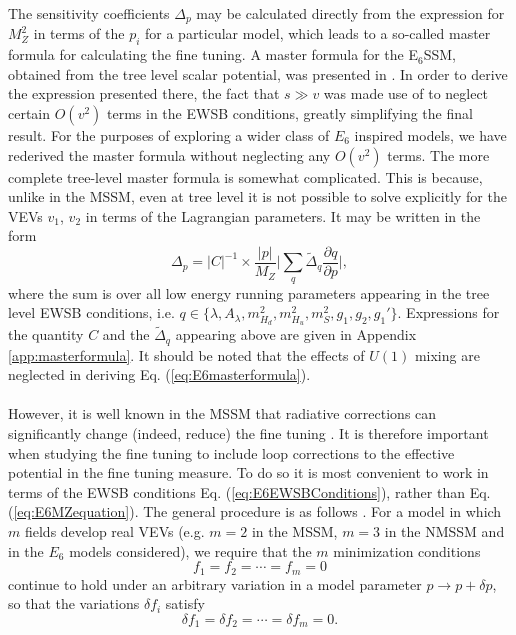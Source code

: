 \documentclass[preprint,amsmath,amssymb,aps,superscriptaddress,prd,showpacs,floatfix,nofootinbib]{revtex4-1}
\newcommand{\be}{\begin{equation}}
\newcommand{\ee}{\end{equation}}
\begin{document}
The sensitivity coefficients $\Delta_p$ may be calculated directly
from the expression for $M_Z^2$ in terms of the $p_i$ for a particular
model, which leads to a so-called master formula for calculating the
fine tuning. A master formula for the E$_6$SSM, obtained from the tree
level scalar potential, was presented in \cite{Athron:2013ipa}. In
order to derive the expression presented there, the fact that $s \gg
v$ was made use of to neglect certain $O(v^2)$ terms in the EWSB
conditions, greatly simplifying the final result. For the purposes of
exploring a wider class of $E_6$ inspired models, we have rederived
the master formula without neglecting any $O(v^2)$ terms. The more
complete tree-level master formula is somewhat complicated. This is
because, unlike in the MSSM, even at tree level it is not possible to
solve explicitly for the VEVs $v_1$, $v_2$ in terms of the Lagrangian
parameters. It may be written in the form \be \Delta_p=|C|^{-1}\times
\frac{|p|}{M_Z}\bigg|\sum_{q}\tilde{\Delta}_q\frac{\partial
  q}{\partial p}\bigg|,
\label{eq:E6masterformula}
\ee where the sum is over all low energy running parameters appearing
in the tree level EWSB conditions, i.e. $q\in\{\lambda, A_\lambda,
m_{H_d}^2,m_{H_u}^2,m_S^2,g_1,g_2,g_1'\}$. Expressions for the
quantity $C$ and the $\tilde{\Delta}_q$ appearing above are given in
Appendix \ref{app:masterformula}. It should be noted that the effects
of $U(1)$ mixing are neglected in deriving
Eq. (\ref{eq:E6masterformula}).\\ \\ However, it is well known in the
MSSM that radiative corrections can significantly change (indeed,
reduce) the fine tuning \cite{Cassel:2010px}. It is therefore
important when studying the fine tuning to include loop corrections to
the effective potential in the fine tuning measure. To do so it is
most convenient to work in terms of the EWSB conditions
Eq. (\ref{eq:E6EWSBConditions}), rather than
Eq. (\ref{eq:E6MZequation}). The general procedure is as follows
\cite{Ellwanger:2011mu}. For a model in which $m$ fields develop real
VEVs (e.g. $m=2$ in the MSSM, $m=3$ in the NMSSM and in the $E_6$
models considered), we require that the $m$ minimization conditions
\begin{equation}\label{eq:EWSBconditions}
f_1=f_2=\dotsb=f_m=0
\end{equation}
continue to hold under an arbitrary variation in a model parameter
$p\rightarrow p+\delta p$, so that the variations $\delta f_i$ satisfy
\begin{equation}\label{eq:EWSBvariations}
\delta f_1 = \delta f_2=\dotsb =\delta f_m =0.
\end{equation}
\end{document}
